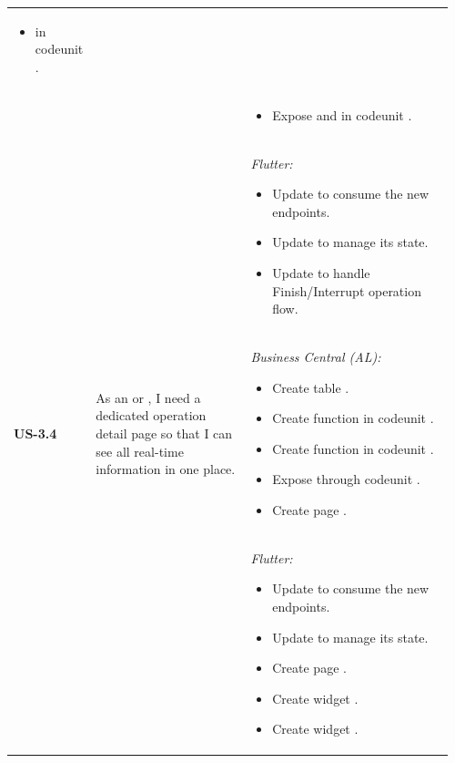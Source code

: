 \begin{longtable}{@{} P{0.09\linewidth} P{0.38\linewidth} P{0.49\linewidth} @{}}
\begin{itemize}[nosep, leftmargin=*]
\begin{itemize}[nosep, leftmargin=*]
			\item {} in codeunit .
		\end{itemize}
	\end{itemize} \\ & &
  	\begin{itemize}[nosep, leftmargin=*]
		\item Expose  and  in codeunit .
	\end{itemize}\\ & &
	\noindent\textit{Flutter:}
	\begin{itemize}[nosep, leftmargin=*]
		\item Update  to consume the new endpoints.
		\item Update  to manage its state.
		\item Update  to handle Finish/Interrupt operation flow.
	\end{itemize} \\
	\midrule
	\textbf{US-3.4}
	& As an  or , I need a dedicated
	operation detail page so that I can see all real-time information
	in one place.
	& \noindent\textit{Business Central (AL):}
	\begin{itemize}[nosep, leftmargin=*]
		\item Create table .
		\item Create function  in codeunit .
		\item Create function  in codeunit .
		\item Expose  through codeunit .
		\item Create page .
	\end{itemize}
\\ & &
	\noindent\textit{Flutter:}
	\begin{itemize}[nosep, leftmargin=*]
		\item Update  to consume the new endpoints.
		\item Update  to manage its state.
		\item Create page .
		\item Create widget .
		\item Create widget .
	\end{itemize}\\
	\midrule
	

\end{longtable}
